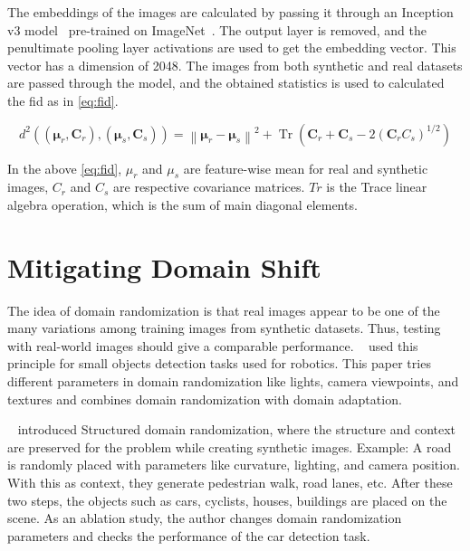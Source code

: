 The embeddings of the images are calculated by passing it through an Inception v3 model~\cite{Szegedy2016RethinkingTI} pre-trained on ImageNet~\cite{Deng2009ImageNetAL}.
The output layer is removed, and the penultimate pooling layer activations are used to get the embedding vector.
This vector has a dimension of 2048.
The images from both synthetic and real datasets are passed through the model, and the obtained statistics is used to calculated the \gls{fid} as in \autoref{eq:fid}.

\begin{equation}
    d^{2}\left((\boldsymbol{\mu}_{r}, \boldsymbol{C}_{r}),\left(\boldsymbol{\mu}_{s}, \boldsymbol{C}_{s}\right)\right)=\left\|\boldsymbol{\mu}_{r}-\boldsymbol{\mu}_{s}\right\|^{2}+\operatorname{Tr}\left(\boldsymbol{C}_{r}+\boldsymbol{C}_{s}-2\left(\boldsymbol{C}_{r} {C}_{s}\right)^{1 / 2}\right)
    \label{eq:fid}
\end{equation}

In the above \autoref{eq:fid}, $\mu_r$ and $\mu_s$ are feature-wise mean for real and synthetic images, $C_r$ and $C_s$ are respective covariance matrices.
$Tr$ is the Trace linear algebra operation, which is the sum of main diagonal elements.


\section{Mitigating Domain Shift}\label{sec:mitigating_domain_shift}

The idea of domain randomization is that real images appear to be one of the many variations among training images from synthetic datasets.
Thus, testing with real-world images should give a comparable performance.
~\cite{tobin2017domain} used this principle for small objects detection tasks used for robotics.
This paper tries different parameters in domain randomization like lights, camera viewpoints, and textures and combines domain randomization with domain adaptation.

~\cite{prakash2020structured} introduced Structured domain randomization, where the structure and context are preserved for the problem while creating synthetic images.
Example: A road is randomly placed with parameters like curvature, lighting, and camera position.
With this as context, they generate pedestrian walk, road lanes, etc.
After these two steps, the objects such as cars, cyclists, houses, buildings are placed on the scene.
As an ablation study, the author changes domain randomization parameters and checks the performance of the car detection task.

